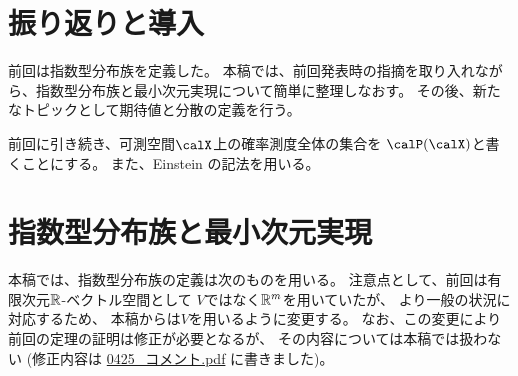 \documentclass[report]{jlreq}
\begin{document}
%

%
\section{振り返りと導入}

前回は指数型分布族を定義した。
本稿では、前回発表時の指摘を取り入れながら、指数型分布族と最小次元実現について簡単に整理しなおす。
その後、新たなトピックとして期待値と分散の定義を行う。

前回に引き続き、可測空間$\calX$上の確率測度全体の集合を
$\calP(\calX)$と書くことにする。
また、Einstein の記法を用いる。

%
\section{指数型分布族と最小次元実現}

本稿では、指数型分布族の定義は次のものを用いる。
注意点として、前回は有限次元$\mathbb{R}$-ベクトル空間として
$V$ではなく$\mathbb{R}^m$を用いていたが、
より一般の状況に対応するため、
本稿からは$V$を用いるように変更する。
なお、この変更により前回の定理の証明は修正が必要となるが、
その内容については本稿では扱わない
(修正内容は \url{0425_コメント.pdf} に書きました)。
\end{document}
